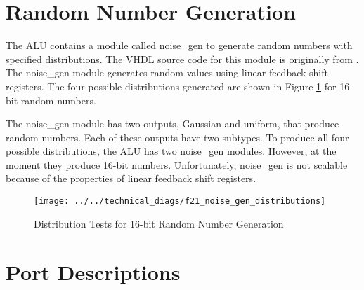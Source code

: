 \documentclass[]{report}
\begin{document}
\clearpage
\section{Random Number Generation}

The ALU contains a module called noise\_gen to generate random numbers with specified distributions. The VHDL source code for this module is originally from \cite{noise gen site}. The noise\_gen module generates random values using linear feedback shift registers. The four possible distributions generated are shown in Figure \ref{fig:noise gen distributions} for 16-bit random numbers.

The noise\_gen module has two outputs, Gaussian and uniform, that produce random numbers. Each of these outputs have two subtypes. To produce all four possible distributions, the ALU has two noise\_gen modules. However, at the moment they produce 16-bit numbers. Unfortunately, noise\_gen is not scalable because of the properties of linear feedback shift registers.  

\begin{figure}[h]
	\centering
	\texttt{[image: ../../technical\_diags/f21\_noise\_gen\_distributions]}
	\caption{Distribution Tests for 16-bit Random Number Generation}
	\label{fig:noise gen distributions}
\end{figure}

\section{Port Descriptions}
\end{document}
